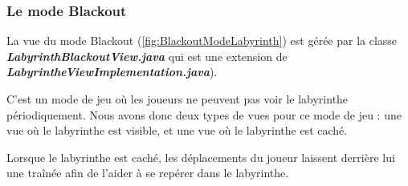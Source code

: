 \subsubsection*{Le mode Blackout}

La vue du mode Blackout (\ref{fig:BlackoutModeLabyrinth}) est gérée par la classe \textbf{\textit{LabyrinthBlackoutView.java}} qui est une extension de \textbf{\textit{LabyrintheViewImplementation.java}}).

C'est un mode de jeu où les joueurs ne peuvent pas voir le labyrinthe périodiquement. Nous avons donc deux types de vues pour ce mode de jeu : une vue où le labyrinthe est visible, et une vue où le labyrinthe est caché.

Lorsque le labyrinthe est caché, les déplacements du joueur laissent derrière lui une traînée afin de l'aider à se repérer dans le labyrinthe.

